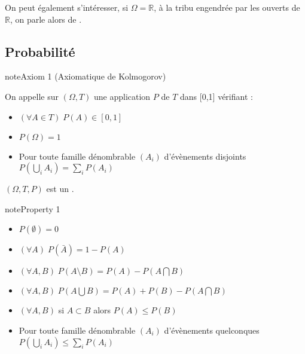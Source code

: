 \documentclass[letterpaper,10pt,english]{jupyterBook}
\begin{document}
\sphinxAtStartPar
On peut également s’intéresser, si \(\Omega=\mathbb R\), à la tribu engendrée par les ouverts de \(\mathbb{R}\), on parle alors de .


\subsection{Probabilité}
\label{\detokenize{Rappels:probabilite}}
\begin{sphinxShadowBox}

\sphinxAtStartPar
{}
\end{sphinxShadowBox}

\ignorespaces \label{Rappels:axiomKolmo}
\begin{sphinxadmonition}{note}{Axiom 1 (Axiomatique de Kolmogorov)}



\sphinxAtStartPar
On appelle  sur \((\Omega,T)\) une application \(P\) de \(T\) dans {[}0,1{]} vérifiant :
\begin{itemize}
\item {} 
\sphinxAtStartPar
\((\forall A\in T)\; P(A)\in[0,1]\)

\item {} 
\sphinxAtStartPar
\(P(\Omega)=1\)

\item {} 
\sphinxAtStartPar
Pour toute famille dénombrable \((A_i)\) d’évènements disjoints \(P(\displaystyle\bigcup_i A_i) = \displaystyle\sum_iP(A_i)\)

\end{itemize}
\end{sphinxadmonition}

\sphinxAtStartPar
\((\Omega,T,P)\) est un .
\label{Rappels:property-10}
\begin{sphinxadmonition}{note}{Property 1}


\begin{itemize}
\item {} 
\sphinxAtStartPar
\(P(\emptyset)=0\)

\item {} 
\sphinxAtStartPar
\((\forall A)\; P(\bar A)=1-P(A)\)

\item {} 
\sphinxAtStartPar
\((\forall A,B)\; P(A\setminus B) = P(A)-P(A\bigcap B)\)

\item {} 
\sphinxAtStartPar
\((\forall A,B)\; P(A\bigcup B) = P(A)+P(B)-P(A\bigcap B)\)

\item {} 
\sphinxAtStartPar
\((\forall A,B)\) si \(A\subset B\) alors \(P(A)\leq P(B)\)

\item {} 
\sphinxAtStartPar
Pour toute famille dénombrable \((A_i)\) d’évènements quelconques \(P(\displaystyle\bigcup_i A_i) \leq \displaystyle\sum_iP(A_i)\)

\end{itemize}
\end{sphinxadmonition}
\end{document}
